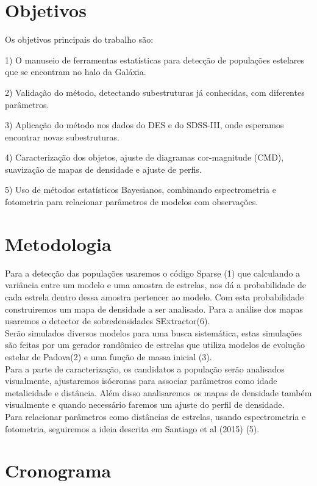 \documentclass{article}
\begin{document}
\section{Objetivos}

Os objetivos principais do trabalho são:

1) O manuseio de ferramentas estatísticas para detecção de populações estelares que se encontram no halo da Galáxia.

2) Validação do método, detectando subestruturas já conhecidas, com diferentes parâmetros.

3) Aplicação do método nos dados do DES e do SDSS-III, onde esperamos encontrar novas subestruturas.

4) Caracterização dos objetos, ajuste de diagramas cor-magnitude (CMD), suavização de mapas de densidade e ajuste de perfis.

5) Uso de métodos estatísticos Bayesianos, combinando espectrometria e fotometria para relacionar parâmetros de modelos com observações.


\section{Metodologia}

 Para a detecção das populações usaremos o código Sparse (1) que calculando a variância entre um modelo e uma amostra de estrelas, nos dá a probabilidade de cada estrela dentro dessa amostra pertencer ao modelo. Com esta probabilidade construiremos um mapa de densidade a ser analisado. Para a análise dos mapas usaremos o detector de sobredensidades SExtractor(6). \\
Serão simulados diversos modelos para uma busca sistemática, estas simulações são feitas por um gerador randômico de estrelas que utiliza modelos de evolução estelar  de Padova(2) e uma função de massa inicial (3). \\
Para a parte de caracterização, os candidatos a população serão analisados visualmente, ajustaremos isócronas para associar parâmetros como idade metalicidade e distância. Além disso analisaremos os mapas de densidade também visualmente e quando necessário faremos um ajuste do  perfil de densidade. \\
Para relacionar parâmetros como distâncias de estrelas, usando espectrometria e fotometria, seguiremos a ideia descrita em Santiago et al (2015) (5).

\section{Cronograma}
\end{document}
